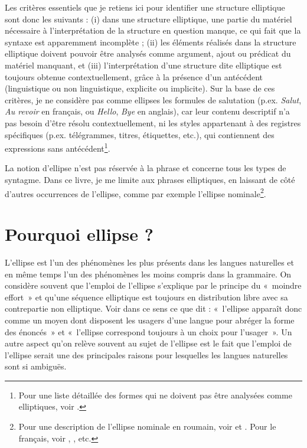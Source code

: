 Les critères essentiels que je retiens ici pour identifier une structure elliptique sont donc les suivants : (i) dans une structure elliptique, une partie du matériel nécessaire à l’interprétation de la structure en question manque, ce qui fait que la syntaxe est apparemment incomplète ; (ii) les éléments réalisés dans la structure elliptique doivent pouvoir être analysés comme argument, ajout ou prédicat du matériel manquant, et (iii) l’interprétation d’une structure dite elliptique est toujours obtenue contextuellement, grâce à la présence d’un antécédent (linguistique ou non linguistique, explicite ou implicite). Sur la base de ces critères, je ne considère pas comme ellipses les formules de salutation (p.ex. \textit{Salut}, \textit{Au revoir} en français, ou \textit{Hello}, \textit{Bye} en anglais), car leur contenu descriptif n’a pas besoin d’être résolu contextuellement, ni les styles appartenant à des registres spécifiques (p.ex. télégrammes, titres, étiquettes, etc.), qui contiennent des expressions sans antécédent\footnote{Pour une liste détaillée des formes qui ne doivent pas être analysées comme elliptiques, voir \citet{Merchant2006,Merchant2013a}.}. 

La notion d’ellipse n’est pas réservée à la phrase et concerne tous les types de syntagme. Dans ce livre, je me limite aux phrases elliptiques, en laissant de côté d’autres occurrences de l’ellipse, comme par exemple l’ellipse nominale\footnote{Pour une description de l’ellipse nominale en roumain, voir \citet{Giurgea2010} et \citet{CornilescuEtAl2010}. Pour le français, voir \citet{Sleeman1996}, \citet{CorblinEtAl2004}, etc.}. 


\section{Pourquoi ellipse ?} \label{ch1:sect1.2}

L’ellipse est l’un des phénomènes les plus présents dans les langues naturelles et en même temps l’un des phénomènes les moins compris dans la grammaire. On considère souvent que l’emploi de l’ellipse s’explique par le principe du «~moin\-dre effort~» et qu’une séquence elliptique est toujours en distribution libre avec sa contrepartie non elliptique. Voir dans ce sens ce que dit \citet[377]{Zribi-Hertz1986}: «~l’ellipse apparaît donc comme un moyen dont disposent les usagers d’une langue pour abréger la forme des énoncés~» et «~l’ellipse correspond toujours à un choix pour l’usager~». Un autre aspect qu’on relève souvent au sujet de l’ellipse est le fait que l’emploi de l’ellipse serait une des principales raisons pour lesquelles les langues naturelles sont si ambiguës. 

